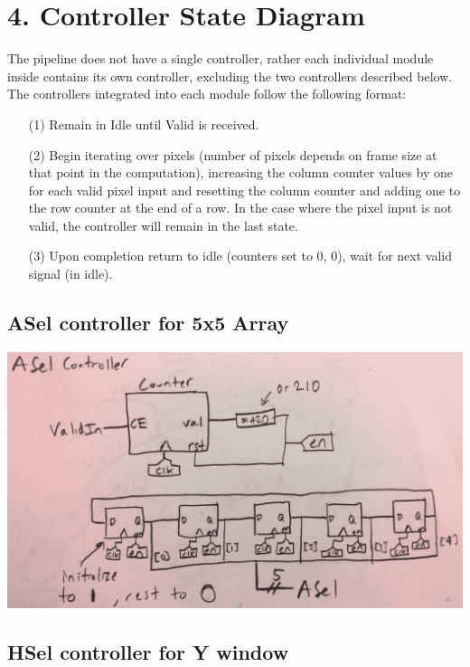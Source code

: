 \documentclass[11pt]{article}
\begin{document}
\section*{4. Controller State Diagram}

The pipeline does not have a single controller, rather each individual module
inside contains its own controller, excluding the two controllers described below. 
The controllers integrated into each module follow the following format:

\begin{itemize}
    \item[(1)] Remain in Idle until Valid is received.
    \item[(2)] Begin iterating over pixels (number of pixels depends on frame size at that point in the computation), increasing the column counter values
        by one for each valid pixel input and resetting the column counter and adding
        one to the row counter at the end of a row. In the case where the pixel
        input is not valid, the controller will remain in the last state.
    \item[(3)] Upon completion return to idle (counters set to 0, 0), wait for next valid signal (in idle).
\end{itemize}

\subsection*{ASel controller for 5x5 Array}

\noindent\includegraphics[width=\textwidth]{controllers/procasel.png}

\subsection*{HSel controller for Y window}
\end{document}
